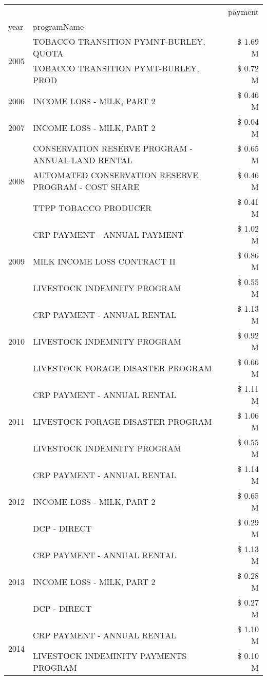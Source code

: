 \begin{tabular}{llr}
\toprule
 &  & payment \\
year & programName &  \\
\midrule
\multirow[t]{2}{*}{2005} & TOBACCO TRANSITION PYMNT-BURLEY, QUOTA & \$ 1.69 M \\
 & TOBACCO TRANSITION PYMT-BURLEY, PROD & \$ 0.72 M \\
\cline{1-3}
2006 & INCOME LOSS - MILK, PART 2 & \$ 0.46 M \\
\cline{1-3}
2007 & INCOME LOSS - MILK, PART 2 & \$ 0.04 M \\
\cline{1-3}
\multirow[t]{3}{*}{2008} & CONSERVATION RESERVE PROGRAM - ANNUAL LAND RENTAL & \$ 0.65 M \\
 & AUTOMATED CONSERVATION RESERVE PROGRAM - COST SHARE & \$ 0.46 M \\
 & TTPP TOBACCO PRODUCER & \$ 0.41 M \\
\cline{1-3}
\multirow[t]{3}{*}{2009} & CRP PAYMENT - ANNUAL PAYMENT & \$ 1.02 M \\
 & MILK INCOME LOSS CONTRACT II & \$ 0.86 M \\
 & LIVESTOCK INDEMNITY PROGRAM & \$ 0.55 M \\
\cline{1-3}
\multirow[t]{3}{*}{2010} & CRP PAYMENT - ANNUAL RENTAL & \$ 1.13 M \\
 & LIVESTOCK INDEMNITY PROGRAM & \$ 0.92 M \\
 & LIVESTOCK FORAGE DISASTER PROGRAM & \$ 0.66 M \\
\cline{1-3}
\multirow[t]{3}{*}{2011} & CRP PAYMENT - ANNUAL RENTAL & \$ 1.11 M \\
 & LIVESTOCK FORAGE DISASTER PROGRAM & \$ 1.06 M \\
 & LIVESTOCK INDEMNITY PROGRAM & \$ 0.55 M \\
\cline{1-3}
\multirow[t]{3}{*}{2012} & CRP PAYMENT - ANNUAL RENTAL & \$ 1.14 M \\
 & INCOME LOSS - MILK, PART 2 & \$ 0.65 M \\
 & DCP - DIRECT & \$ 0.29 M \\
\cline{1-3}
\multirow[t]{3}{*}{2013} & CRP PAYMENT - ANNUAL RENTAL & \$ 1.13 M \\
 & INCOME LOSS - MILK, PART 2 & \$ 0.28 M \\
 & DCP - DIRECT & \$ 0.27 M \\
\cline{1-3}
\multirow[t]{3}{*}{2014} & CRP PAYMENT - ANNUAL RENTAL & \$ 1.10 M \\
 & LIVESTOCK INDEMINITY PAYMENTS PROGRAM & \$ 0.10 M \\

\end{tabular}
